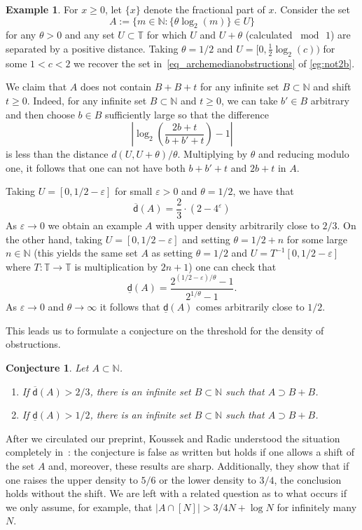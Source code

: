 \documentclass[10pt,dvipsnames]{article}
\newtheorem{conjecture}[theorem]{Conjecture}
\theoremstyle{definition}
\newtheorem{example}[theorem]{Example}
\theoremstyle{plain}
\newcommand{\N}{\mathbb{N}}
\newcommand{\T}{\mathbb{T}}
\newcommand{\udens}{\overline{\mathsf{d}}}
\newcommand{\ldens}{\underline{\mathsf{d}}}
\begin{document}
\begin{example}
\label{example_nextexamplebutnowitsgone}
For $x\geq 0$, let $\{x\}$ denote the fractional part of $x$.  
Consider the set 
\[
A:=\Big\{m\in\N:\big\{\theta\log_2(m)\big\}\in U\Big\}
\]
for any $\theta>0$ and any set $U\subset\T$ for which $U$ and $U+\theta$ (calculated $\bmod\,1$) are separated by a positive distance.
Taking $\theta=1/2$ and $U=\big[0,\tfrac12\log_2(c)\big)$ for some $1 < c< 2$ we recover the set in~\eqref{eq_archemedianobstructions} of \cref{eg:not2b}.

We claim that $A$ does not contain $B+B+t$ for any infinite set $B\subset\N$ and shift $t\geq 0$.
Indeed, for any infinite set $B\subset\N$ and $t\geq 0$, we can take $b'\in B$ arbitrary and then choose $b\in B$ sufficiently large so that the difference
\[
\left|\log_2\left(\frac{2b+t}{b+b'+t}\right)-1\right|
\]
is less than the distance $d(U,U+\theta)/\theta$.
Multiplying by $\theta$ and reducing modulo one, it follows that one can not have both $b+b'+t$ and $2b+t$ in $A$.

Taking $U=[0,1/2-\varepsilon]$ for small $\varepsilon>0$ and $\theta=1/2$, we have that 
\[
\udens(A)=\frac23\cdot(2-4^\varepsilon)
\]
As $\varepsilon\to0$ we obtain an example $A$ with upper density arbitrarily close to $2/3$.
On the other hand, taking  $U=[0,1/2-\varepsilon]$ and setting $\theta=1/2+n$ for some large $n\in\N$ (this yields the same set $A$ as setting $\theta=1/2$ and $U=T^{-1}[0,1/2-\varepsilon]$ where $T\colon\T\to\T$ is multiplication by $2n+1$) one can check that 
\[
\ldens(A)=\frac{2^{(1/2-\varepsilon)/\theta}-1}{2^{1/\theta}-1}.
\]
As $\varepsilon\to0$ and $\theta\to\infty$ it follows that $\ldens(A)$ comes  arbitrarily close to $1/2$.
\end{example}



This leads us to formulate a conjecture on the threshold for the density of obstructions.
\begin{conjecture}
\label{question_unrestricted_density_greater_than_half}Let $A\subset\N$.
\begin{enumerate}
    \item If $\udens(A)>2/3$,  there is an infinite set $B\subset\N$ such that $A\supset B+B$.
    \item If $\ldens(A)>1/2$,  there is an infinite set $B\subset\N$ such that $A\supset B+B$.
\end{enumerate}
\end{conjecture}
After we circulated our preprint, Koussek and  Radic understood the situation completely in~\cite{KR}: the conjecture is false as written but holds if one allows a shift of the set $A$  and, moreover, these results are sharp.  Additionally, they show that if one raises the upper density to $5/6$ or the lower density to $3/4$, the conclusion holds without the shift. 
We are left with a related question as to what occurs if we only assume, for example, that $|A\cap[N]|>3/4N+\log N$ for infinitely many $N$.
\end{document}
